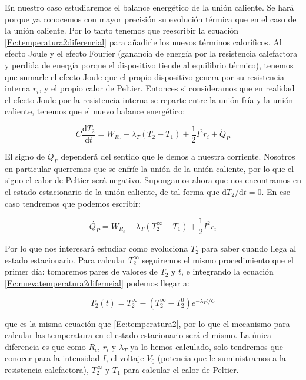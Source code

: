 \documentclass[12pt,a4paper]{article}
\newcommand{\D}{\mathrm{d}}
\begin{document}
En nuestro caso estudiaremos el balance energético de la unión caliente. Se hará porque ya conocemos con mayor precisión su evolución térmica que en el caso de la unión caliente. Por lo tanto tenemos que reescribir la ecuación \ref{Ec:temperatura2diferencial} para añadirle los nuevos términos  caloríficos. Al efecto Joule y el efecto Fourier (ganancia de energía por la resistencia calefactora y perdida de energía porque el dispositivo tiende al equilibrio térmico), tenemos que sumarle el efecto Joule que el propio dispositivo genera por su resistencia interna $r_i$, y el propio calor de Peltier. Entonces si consideramos que en realidad el efecto Joule por la resistencia interna se reparte entre la unión fría y la unión caliente, tenemos que el nuevo balance energético:

\begin{equation}
C \dfrac{\D T_2}{\D t} = W_{R_c} - \lambda_T (T_2 - T_1) + \dfrac{1}{2} I^2 r_i \pm \dot{Q}_P
\label{Ec:nuevatemperatura2diferneial}
\end{equation}

El signo de $\dot{Q}_P$ dependerá del sentido que le demos a nuestra corriente. Nosotros en particular querremos que se enfríe la unión de la unión caliente, por lo que el signo el calor de Peltier será negativo. Supongamos ahora que nos encontramos en el estado estacionario de la unión caliente, de tal forma que $\D T_2 / \D t = 0$. En ese caso tendremos que podemos escribir:

\begin{equation}
\dot{Q_P} = W_{R_c} - \lambda_T (T_2^{\infty} - T_1) + \dfrac{1}{2} I^2 r_i
\end{equation}

Por lo que nos interesará estudiar como evoluciona $T_2$ para saber cuando llega al estado estacionario. Para calcular $T_2^{\infty}$ seguiremos el mismo procedimiento que el primer día: tomaremos pares de valores de $T_2$ y $t$, e integrando la ecuación \ref{Ec:nuevatemperatura2diferneial} podemos llegar a:

\begin{equation}
T_2(t) = T_2^{\infty}  - (T_2^{\infty} - T_2^0) e^{-\lambda_T t/C}
\end{equation}

que es la misma ecuación que \ref{Ec:temperatura2}, por lo que el mecanismo para calcular las temperatura en el estado estacionario será el mismo. La única diferencia es que como $R_c$, $r_i$ y $\lambda_T$ ya lo hemos calculado, solo tendremos que conocer para la intensidad $I$, el voltaje $V_0$ (potencia que le suministramos a la resistencia calefactora), $T_2^{\infty}$ y $T_1$ para calcular el calor de Peltier. 
\end{document}
